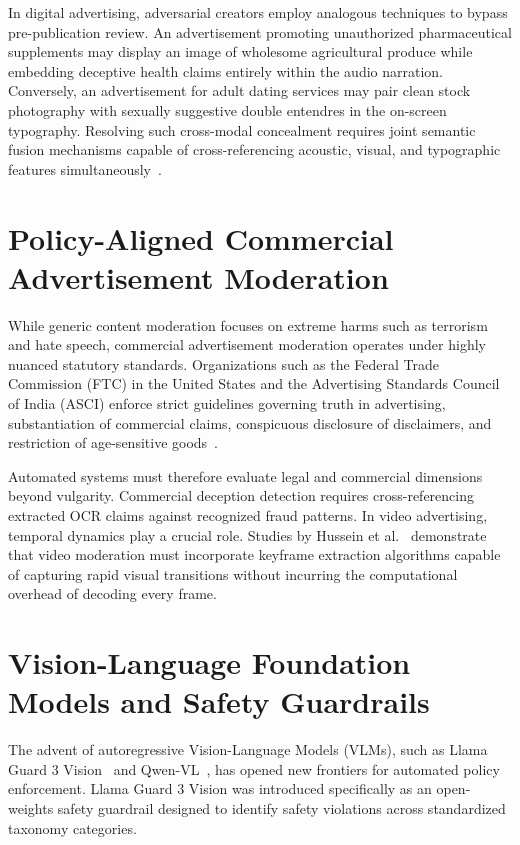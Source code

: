 \documentclass[12pt,a4paper]{report}
\begin{document}
In digital advertising, adversarial creators employ analogous techniques to bypass pre-publication review. An advertisement promoting unauthorized pharmaceutical supplements may display an image of wholesome agricultural produce while embedding deceptive health claims entirely within the audio narration. Conversely, an advertisement for adult dating services may pair clean stock photography with sexually suggestive double entendres in the on-screen typography. Resolving such cross-modal concealment requires joint semantic fusion mechanisms capable of cross-referencing acoustic, visual, and typographic features simultaneously~\cite{sharma2022survey}.

\section{Policy-Aligned Commercial Advertisement Moderation}
While generic content moderation focuses on extreme harms such as terrorism and hate speech, commercial advertisement moderation operates under highly nuanced statutory standards. Organizations such as the Federal Trade Commission (FTC) in the United States and the Advertising Standards Council of India (ASCI) enforce strict guidelines governing truth in advertising, substantiation of commercial claims, conspicuous disclosure of disclaimers, and restriction of age-sensitive goods~\cite{ftc2020guides, asci2021code}.

Automated systems must therefore evaluate legal and commercial dimensions beyond vulgarity. Commercial deception detection requires cross-referencing extracted OCR claims against recognized fraud patterns. In video advertising, temporal dynamics play a crucial role. Studies by Hussein et al.~\cite{hussein2020multimodal} demonstrate that video moderation must incorporate keyframe extraction algorithms capable of capturing rapid visual transitions without incurring the computational overhead of decoding every frame.

\section{Vision-Language Foundation Models and Safety Guardrails}
The advent of autoregressive Vision-Language Models (VLMs), such as Llama Guard 3 Vision~\cite{metallama2024} and Qwen-VL~\cite{bai2023qwen}, has opened new frontiers for automated policy enforcement. Llama Guard 3 Vision was introduced specifically as an open-weights safety guardrail designed to identify safety violations across standardized taxonomy categories.
\end{document}
